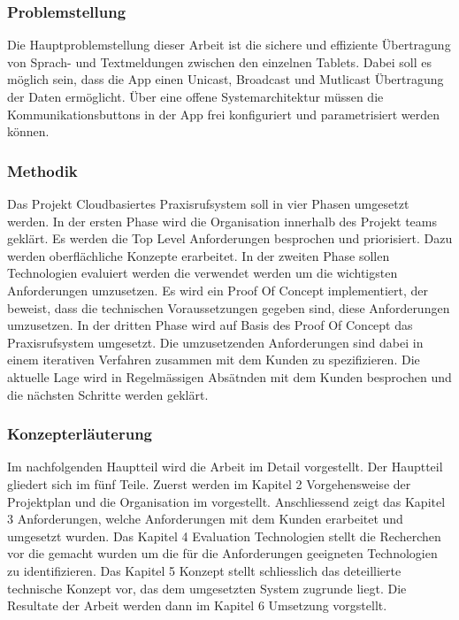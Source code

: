\subsubsection*{Problemstellung}

Die Hauptproblemstellung dieser Arbeit ist die sichere und effiziente Übertragung von Sprach- und Textmeldungen zwischen den einzelnen Tablets.
Dabei soll es möglich sein, dass die App einen Unicast, Broadcast und Mutlicast Übertragung der Daten ermöglicht.
Über eine offene Systemarchitektur müssen die Kommunikationsbuttons in der App frei konfiguriert und parametrisiert werden können.


\clearpage
\subsubsection*{Methodik}

Das Projekt Cloudbasiertes Praxisrufsystem soll in vier Phasen umgesetzt werden.
In der ersten Phase wird die Organisation innerhalb des Projekt teams geklärt.
Es werden die Top Level Anforderungen besprochen und priorisiert.
Dazu werden oberflächliche Konzepte erarbeitet.
In der zweiten Phase sollen Technologien evaluiert werden die verwendet werden um die wichtigsten Anforderungen umzusetzen.
Es wird ein Proof Of Concept implementiert, der beweist, dass die technischen Voraussetzungen gegeben sind, diese Anforderungen umzusetzen.
In der dritten Phase wird auf Basis des Proof Of Concept das Praxisrufsystem umgesetzt.
Die umzusetzenden Anforderungen sind dabei in einem iterativen Verfahren zusammen mit dem Kunden zu spezifizieren.
Die aktuelle Lage wird in Regelmässigen Absätnden mit dem Kunden besprochen und die nächsten Schritte werden geklärt.

\subsubsection*{Konzepterläuterung}

Im nachfolgenden Hauptteil wird die Arbeit im Detail vorgestellt.
Der Hauptteil gliedert sich im fünf Teile.
Zuerst werden im Kapitel 2 Vorgehensweise der Projektplan und die Organisation im vorgestellt.
Anschliessend zeigt das Kapitel 3 Anforderungen, welche Anforderungen mit dem Kunden erarbeitet und umgesetzt wurden.
Das Kapitel 4 Evaluation Technologien stellt die Recherchen vor die gemacht wurden um die für die Anforderungen geeigneten Technologien zu identifizieren.
Das Kapitel 5 Konzept stellt schliesslich das deteillierte technische Konzept vor, das dem umgesetzten System zugrunde liegt.
Die Resultate der Arbeit werden dann im Kapitel 6 Umsetzung vorgstellt.


\clearpage
